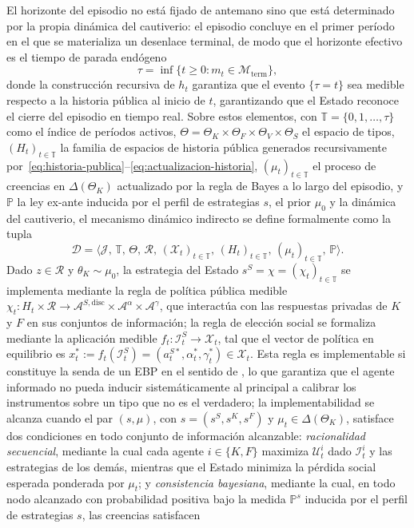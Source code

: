 \documentclass[review,authoryear,12pt]{elsarticle}
\theoremstyle{plain}
\theoremstyle{definition}
\newcommand{\Prob}{\mathbb{P}}
\newcommand{\ThetaK}{\Theta_K}
\newcommand{\1}{\mathbf{1}}
\begin{document}
El horizonte del episodio no está fijado de antemano sino que está determinado por la propia dinámica del cautiverio: el episodio concluye en el primer período en el que se materializa un desenlace terminal, de modo que el horizonte efectivo es el tiempo de parada endógeno
\begin{equation}
\tau=\inf\{t\geq 0:m_t\in\mathcal{M}_{\mathrm{term}}\},\label{eq:stopping-time}
\end{equation}
donde la construcción recursiva de $h_t$ garantiza que el evento $\{\tau=t\}$ sea medible respecto a la historia pública al inicio de $t$, garantizando que el Estado reconoce el cierre del episodio en tiempo real. Sobre estos elementos, con $\mathbb{T}=\{0,1,\ldots,\tau\}$ como el índice de períodos activos, $\Theta=\ThetaK\times\Theta_F\times\Theta_V\times\Theta_S$ el espacio de tipos, $(H_t)_{t\in\mathbb{T}}$ la familia de espacios de historia pública generados recursivamente por~\eqref{eq:historia-publica}--\eqref{eq:actualizacion-historia}, $(\mu_t)_{t\in\mathbb{T}}$ el proceso de creencias en $\Delta(\ThetaK)$ actualizado por la regla de Bayes a lo largo del episodio, y $\Prob$ la ley ex-ante inducida por el perfil de estrategias $s$, el prior $\mu_0$ y la dinámica del cautiverio, el mecanismo dinámico indirecto se define formalmente como la tupla
\[
\mathcal{D}=\bigl\langle\mathcal{J},\,\mathbb{T},\,\Theta,\,\mathcal{R},\,(\mathcal{X}_t)_{t\in\mathbb{T}},\,(H_t)_{t\in\mathbb{T}},\,(\mu_t)_{t\in\mathbb{T}},\,\Prob\bigr\rangle.
\]
Dado $z\in\mathcal{R}$ y $\theta_K\sim\mu_0$, la estrategia del Estado $s^S=\chi=(\chi_t)_{t\in\mathbb{T}}$ se implementa mediante la regla de política pública medible $\chi_t\colon H_t\times\mathcal{R}\to\mathcal{A}^{S,\mathrm{disc}}\times\mathcal{A}^{\alpha}\times\mathcal{A}^{\gamma}$, que interactúa con las respuestas privadas de $K$ y $F$ en sus conjuntos de información; la regla de elección social se formaliza mediante la aplicación medible $f_t\colon\mathcal{I}_t^S\to\mathcal{X}_t$, tal que el vector de política en equilibrio es $x_t^\ast:=f_t(\mathcal{I}_t^S)=(a_t^{S\ast},\alpha_t^\ast,\gamma_t^\ast)\in\mathcal{X}_t$. Esta regla es implementable si constituye la senda de un EBP en el sentido de \citet{FudenbergTirole1991}, lo que garantiza que el agente informado no pueda inducir sistemáticamente al principal a calibrar los instrumentos sobre un tipo que no es el verdadero; la implementabilidad se alcanza cuando el par $(s,\mu)$, con $s=(s^S,s^K,s^F)$ y $\mu_t\in\Delta(\ThetaK)$, satisface dos condiciones en todo conjunto de información alcanzable: \emph{racionalidad secuencial}, mediante la cual cada agente $i\in\{K,F\}$ maximiza $\mathcal{U}_t^i$ dado $\mathcal{I}_t^i$ y las estrategias de los demás, mientras que el Estado minimiza la pérdida social esperada ponderada por $\mu_t$; y \emph{consistencia bayesiana}, mediante la cual, en todo nodo alcanzado con probabilidad positiva bajo la medida $\Prob^s$ inducida por el perfil de estrategias $s$, las creencias satisfacen
\end{document}
